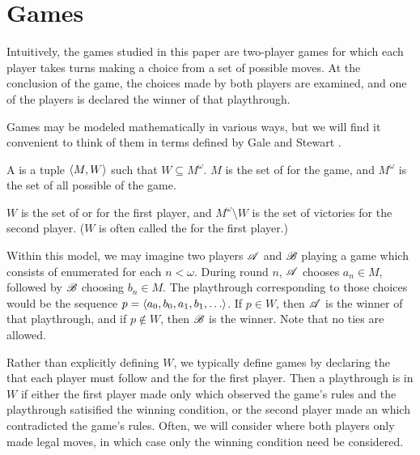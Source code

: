\section{Games}

Intuitively, the games studied in this paper are two-player games for which
each player takes turns making a choice from a set of possible moves. At
the conclusion of the game, the choices made by both players are examined,
and one of the players is declared the winner of that playthrough.

Games may be modeled mathematically in various ways,
but we will find it convenient to think of them in terms defined by
Gale and Stewart \cite{MR0054922}.

\begin{defn}
  A  is a tuple $\langle M,W\rangle$ such that
  $W\subseteq M^{\omega}$. $M$ is the set of  for
  the game, and $M^{\omega}$ is the set of all possible
   of the game.

  $W$ is the set of  or  for the
  first player, and $M^{\omega}\setminus W$ is the set of victories for the
  second player. ($W$ is often called the  for the
  first player.)
\end{defn}

Within this model, we may imagine two players $\mathscr{A}$ and $\mathscr{B}$ playing a
game which consists of  enumerated for each $n<\omega$.
During round $n$, $\mathscr{A}$ chooses $a_n\in M$, followed by $\mathscr{B}$ choosing
$b_n\in M$. The playthrough corresponding to those choices would be
the sequence $p = \<a_0,b_0,a_1,b_1,\dots\>$. If $p\in W$, then $\mathscr{A}$
is the winner of that playthrough, and if $p\not\in W$, then $\mathscr{B}$ is
the winner. Note that no ties are allowed.

Rather than explicitly defining $W$, we
typically define games by declaring the  that each player must
follow and the  for the first player.
Then a playthrough is in $W$ if either
the first player made only  which observed the game's rules
and the playthrough satisified the winning condition, or the second player
made an  which contradicted the game's rules.
Often, we will consider  where both players only
made legal moves, in which case only the winning condition need be considered.

